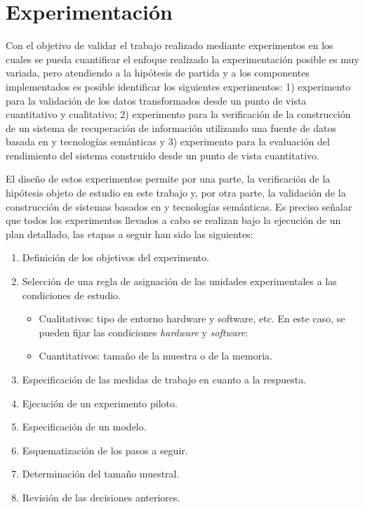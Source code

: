 \documentclass[a4paper,final,11pt,fleqn,twoside]{book}  %
\begin{document}
\chapter{Experimentación}
Con el objetivo de validar el trabajo realizado mediante experimentos en los cuales se pueda cuantificar el 
enfoque realizado la experimentación posible es muy variada, pero atendiendo  a la hipótesis de partida y a 
los componentes implementados es posible identificar los siguientes experimentos: 1) experimento para la validación de los datos 
transformados desde un punto de vista cuantitativo y cualitativo; 2) experimento para la verificación de la construcción de 
un sistema de recuperación de información utilizando una fuente de datos basada en \linkeddata y tecnologías semánticas y 3) 
experimento para la evaluación del rendimiento del sistema construido desde un punto de vista cuantitativo.

El diseño de estos experimentos permite por una parte, la verificación de la hipótesis objeto de estudio en este trabajo y, por otra parte, 
la validación de la construcción de sistemas basados en \linkeddata y tecnologías semánticas. Es preciso señalar que todos los experimentos llevados a cabo se realizan 
bajo la ejecución de un plan detallado, las etapas a seguir han sido las siguientes:
\begin{enumerate}
 \item Definición de los objetivos del experimento. 
\item Selección de una regla de asignación de las unidades experimentales a las condiciones de estudio. 
\begin{itemize}
 \item Cualitativos: tipo de entorno hardware y software, etc. En este caso, se pueden fijar las condiciones \textit{hardware} y \textit{software}:
 \item Cuantitativos: tamaño de la muestra o de la memoria.
\end{itemize}
 \item Especificación de las medidas de trabajo en cuanto a la respuesta.
 \item Ejecución de un experimento piloto. 
 \item Especificación de un modelo.
 \item Esquematización de los pasos a seguir. 
 \item Determinación del tamaño muestral.
 \item Revisión de las decisiones anteriores.
\end{enumerate}
\end{document}
